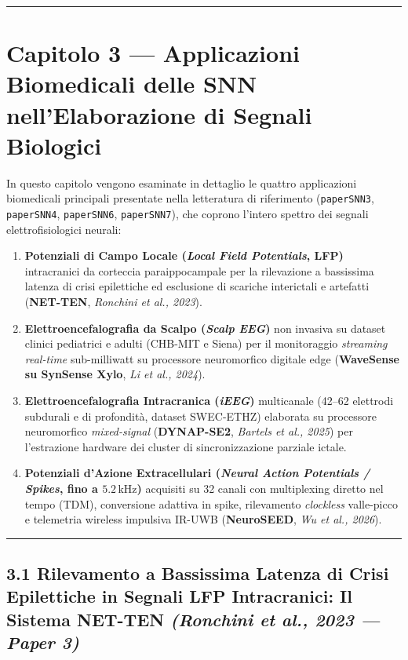 \documentclass[11pt,a4paper]{article}
\begin{document}
\bigskip\hrule\bigskip

\section{Capitolo 3 --- Applicazioni Biomedicali delle SNN nell'Elaborazione di Segnali Biologici}

In questo capitolo vengono esaminate in dettaglio le quattro applicazioni biomedicali principali presentate nella letteratura di riferimento (\texttt{paperSNN3}, \texttt{paperSNN4}, \texttt{paperSNN6}, \texttt{paperSNN7}), che coprono l'intero spettro dei segnali elettrofisiologici neurali:
\begin{enumerate}
  \item \textbf{Potenziali di Campo Locale (\textit{Local Field Potentials}, LFP)} intracranici da corteccia paraippocampale per la rilevazione a bassissima latenza di crisi epilettiche ed esclusione di scariche interictali e artefatti (\textbf{NET-TEN}, \textit{Ronchini et al., 2023}).
  \item \textbf{Elettroencefalografia da Scalpo (\textit{Scalp EEG})} non invasiva su dataset clinici pediatrici e adulti (CHB-MIT e Siena) per il monitoraggio \textit{streaming real-time} sub-milliwatt su processore neuromorfico digitale edge (\textbf{WaveSense su SynSense Xylo}, \textit{Li et al., 2024}).
  \item \textbf{Elettroencefalografia Intracranica (\textit{iEEG})} multicanale (42--62 elettrodi subdurali e di profondità, dataset SWEC-ETHZ) elaborata su processore neuromorfico \textit{mixed-signal} (\textbf{DYNAP-SE2}, \textit{Bartels et al., 2025}) per l'estrazione hardware dei cluster di sincronizzazione parziale ictale.
  \item \textbf{Potenziali d'Azione Extracellulari (\textit{Neural Action Potentials / Spikes}, fino a $5.2\,\text{kHz}$)} acquisiti su 32 canali con multiplexing diretto nel tempo (TDM), conversione adattiva in spike, rilevamento \textit{clockless} valle-picco e telemetria wireless impulsiva IR-UWB (\textbf{NeuroSEED}, \textit{Wu et al., 2026}).
\end{enumerate}

\bigskip\hrule\bigskip

\subsection{3.1 Rilevamento a Bassissima Latenza di Crisi Epilettiche in Segnali LFP Intracranici: Il Sistema NET-TEN \textit{(Ronchini et al., 2023 --- Paper 3)}}
\end{document}
